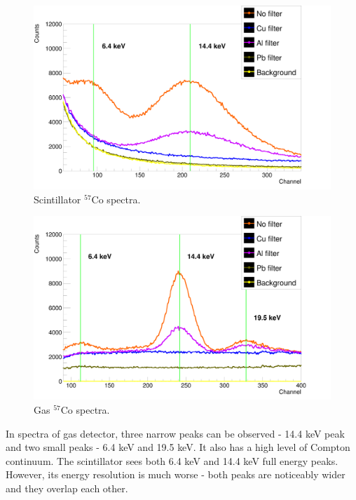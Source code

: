 \begin{figure}[H]
\centering
\includegraphics[scale=0.125, angle = 0]{./pictures/PMTSpectre.png}
\caption{Scintillator $^{57}$Co spectra.}
\label{Scintillator detector spectra.}
\end{figure}

\begin{figure}[H]
\centering
\includegraphics[scale=0.125, angle = 0]{./pictures/GasSpectre.png}
\caption{Gas $^{57}$Co spectra.}
\label{Gas detector spectra.}

\end{figure}


In spectra of gas detector, three narrow peaks can be observed - 14.4 keV peak and two small peaks - 6.4 keV and 19.5 keV. It also has a high level of Compton continuum.
The scintillator sees both 6.4 keV and 14.4 keV full energy peaks. However, its energy resolution is much worse - both peaks are noticeably wider and they overlap each other. 

